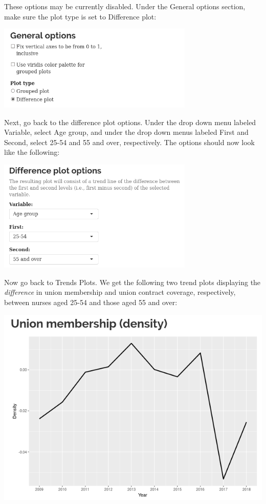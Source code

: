 \documentclass[letterpaper,12pt]{article}
\begin{document}
\begin{enumerate}
\begin{center}
  \end{center}
  These options may be currently disabled. Under the General options
  section, make sure the plot type is set to Difference plot:
  \begin{center}
    \includegraphics[width=0.7\textwidth]{images/trends_ex2/options_plot_type.png}
  \end{center}
  Next, go back to the difference plot options. Under the drop down
  menu labeled Variable, select Age group, and under the drop down
  menus labeled First and Second, select 25-54 and 55 and over,
  respectively. The options should now look like the following:
  \begin{center}
    \includegraphics[width=0.7\textwidth]{images/trends_ex2/options_diff_plots2.png}
  \end{center}
  Now go back to Trends \textrightarrow{} Plots. We get the following
  two trend plots displaying the \emph{difference} in union membership
  and union contract coverage, respectively, between nurses aged 25-54
  and those aged 55 and over:
  \begin{center}
    \includegraphics[width=0.49\linewidth]{images/trends_ex2/membership_trend.png}

\end{center}
\end{enumerate}
\end{document}
